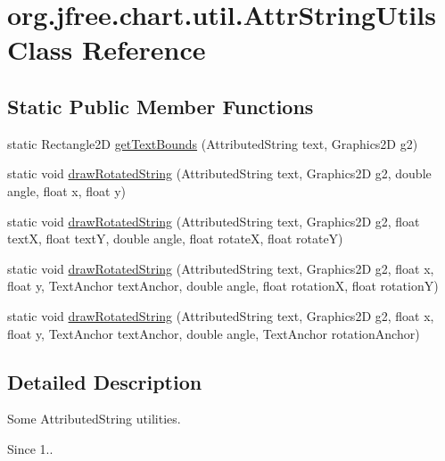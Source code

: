 \hypertarget{classorg_1_1jfree_1_1chart_1_1util_1_1_attr_string_utils}{}\section{org.\+jfree.\+chart.\+util.\+Attr\+String\+Utils Class Reference}
\label{classorg_1_1jfree_1_1chart_1_1util_1_1_attr_string_utils}
\subsection*{Static Public Member Functions}
\begin{DoxyCompactItemize}
\item 
static Rectangle2D \mbox{\hyperlink{classorg_1_1jfree_1_1chart_1_1util_1_1_attr_string_utils_afe6e808417c8ff2db6fa9f0d19583120}{get\+Text\+Bounds}} (Attributed\+String text, Graphics2D g2)
\item 
static void \mbox{\hyperlink{classorg_1_1jfree_1_1chart_1_1util_1_1_attr_string_utils_a025319962e8f093cb2964ee90503d3e1}{draw\+Rotated\+String}} (Attributed\+String text, Graphics2D g2, double angle, float x, float y)
\item 
static void \mbox{\hyperlink{classorg_1_1jfree_1_1chart_1_1util_1_1_attr_string_utils_a663719d4a9243e06c939a4f9a4c51e6b}{draw\+Rotated\+String}} (Attributed\+String text, Graphics2D g2, float textX, float textY, double angle, float rotateX, float rotateY)
\item 
static void \mbox{\hyperlink{classorg_1_1jfree_1_1chart_1_1util_1_1_attr_string_utils_a288f0992e17da17f9ec157d59883f25c}{draw\+Rotated\+String}} (Attributed\+String text, Graphics2D g2, float x, float y, Text\+Anchor text\+Anchor, double angle, float rotationX, float rotationY)
\item 
static void \mbox{\hyperlink{classorg_1_1jfree_1_1chart_1_1util_1_1_attr_string_utils_a50ba4e87808b54f9ec3a6e7b91b0c7b4}{draw\+Rotated\+String}} (Attributed\+String text, Graphics2D g2, float x, float y, Text\+Anchor text\+Anchor, double angle, Text\+Anchor rotation\+Anchor)
\end{DoxyCompactItemize}


\subsection{Detailed Description}
Some {\ttfamily Attributed\+String} utilities.

\begin{DoxySince}{Since}
1.. 
\end{DoxySince}


